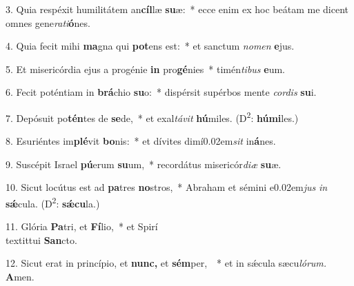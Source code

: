 \item 3. Quia respéxit humilitátem an\textbf{cíl}læ \textbf{su}æ:~* ecce enim ex hoc beátam me dicent omnes gene\textit{rati}\textbf{ó}nes.

\item 4. Quia fecit mihi \textbf{ma}gna qui \textbf{pot}ens est:~* et sanctum \textit{nomen} \textbf{e}jus.

\item 5. Et misericórdia ejus a progénie \textbf{in} pro\textbf{gé}nies~* timén\textit{tibus} \textbf{e}um.

\item 6. Fecit poténtiam in \textbf{brá}chio \textbf{su}o:~* dispérsit supérbos mente \textit{cordis} \textbf{su}i.

\item 7. Depósuit po\textbf{tén}tes de \textbf{se}de,~* et exal\textit{távit} \textbf{hú}miles. (D\textsuperscript{2}: \textbf{húmi}les.)

\item 8. Esuriéntes im\textbf{plé}vit \textbf{bo}nis:~* et dívites dimí\kern 0.02em\textit{sit} in\textbf{á}nes.

\item 9. Suscépit Israel \textbf{pú}erum \textbf{su}um,~* recordátus misericór\textit{diæ} \textbf{su}æ.

\item 10. Sicut locútus est ad \textbf{pa}tres \textbf{no}stros,~* Abraham et sémini e\kern 0.02em\textit{jus} \textit{in} \textbf{sǽ}cula. (D\textsuperscript{2}: \textbf{sǽcu}la.)

\item 11. Glória \textbf{Pa}tri, et \textbf{Fí}lio,~* et Spirí\hspace{0.03em}\\textit{tui} \textbf{San}cto.

\item 12. Sicut erat in princípio, et \textbf{nunc,} et \textbf{sém}per, ~* et in sǽcula sæcu\hspace{0.03em}\textit{lórum.} \textbf{A}men.